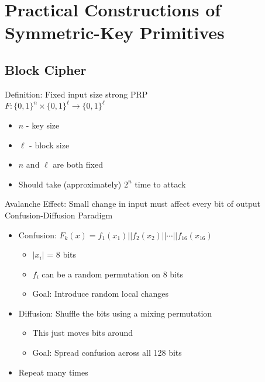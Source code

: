 \section{Practical Constructions of Symmetric-Key Primitives}
\subsection*{Block Cipher}
Definition: Fixed input size strong PRP\\
$F:\{0,1\}^{n} \times \{0,1\}^{\ell}\rightarrow \{0,1\}^{\ell}$
\begin{itemize}
    \item $n$ - key size
    \item $\ell$ - block size
    \item $n$ and $\ell$ are both fixed
    \item Should take (approximately) $2^n$ time to attack
\end{itemize}

Avalanche Effect: Small change in input must affect every bit of output\\

Confusion-Diffusion  Paradigm
\begin{itemize}
    \item Confusion: $F_k(x)=f_1(x_1)||f_2(x_2)||\cdots||f_{16}(x_16)$
    \begin{itemize}
        \item $|x_i|$ = 8 bits
        \item $f_i$ can be a random permutation on 8 bits
        \item Goal: Introduce random local changes
    \end{itemize}
    \item Diffusion: Shuffle the bits using a mixing permutation
    \begin{itemize}
        \item This just moves bits around
        \item Goal: Spread confusion across all 128 bits
    \end{itemize}
    \item  Repeat many times
\end{itemize}

